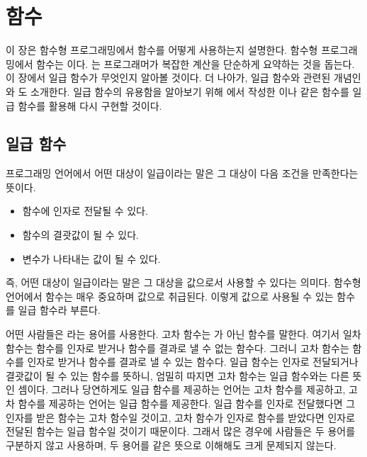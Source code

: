 \chapter{함수}

이 장은 함수형 프로그래밍에서 함수를 어떻게 사용하는지 설명한다. 함수형
프로그래밍에서 함수는 이다. 는 프로그래머가 복잡한 계산을 단순하게 요약하는 것을 돕는다. 이 장에서
일급 함수가 무엇인지 알아볼 것이다. 더 나아가, 일급 함수와 관련된 개념인
와 도 소개한다. 일급
함수의 유용함을 알아보기 위해 에서 작성한 이나
 같은 함수를 일급 함수를 활용해 다시 구현할 것이다.

\section{일급 함수}

프로그래밍 언어에서 어떤 대상이 일급이라는 말은 그 대상이 다음 조건을 만족한다는
뜻이다.

\begin{itemize}
\item 함수에 인자로 전달될 수 있다.
\item 함수의 결괏값이 될 수 있다.
\item 변수가 나타내는 값이 될 수 있다.
\end{itemize}

즉, 어떤 대상이 일급이라는 말은 그 대상을 값으로서 사용할 수 있다는 의미다.
함수형 언어에서 함수는 매우 중요하며 값으로 취급된다. 이렇게 값으로 사용될 수
있는 함수를 일급 함수라 부른다.

어떤 사람들은 라는 용어를 사용한다. 고차
함수는 가 아닌 함수를 말한다. 여기서 일차
함수는 함수를 인자로 받거나 함수를 결과로 낼 수 없는 함수다. 그러니 고차 함수는
함수를 인자로 받거나 함수를 결과로 낼 수 있는 함수다. 일급 함수는 인자로
전달되거나 결괏값이 될 수 있는 함수를 뜻하니, 엄밀히 따지면 고차 함수는 일급
함수와는 다른 뜻인 셈이다. 그러나 당연하게도 일급 함수를 제공하는 언어는 고차
함수를 제공하고, 고차 함수를 제공하는 언어는 일급 함수를 제공한다. 일급 함수를
인자로 전달했다면 그 인자를 받은 함수는 고차 함수일 것이고, 고차 함수가 인자로
함수를 받았다면 인자로 전달된 함수는 일급 함수일 것이기 때문이다. 그래서 많은
경우에 사람들은 두 용어를 구분하지 않고 사용하며, 두 용어를 같은 뜻으로 이해해도
크게 문제되지 않는다.

